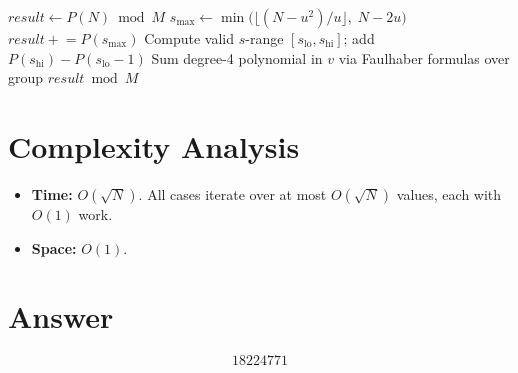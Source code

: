 \documentclass[11pt,a4paper]{article}
\begin{document}
\begin{algorithmic}[1]
  \State $\mathit{result} \gets P(N) \bmod M$ 
   
    \State $s_{\max} \gets \min\!\bigl(\lfloor(N-u^2)/u\rfloor,\; N-2u\bigr)$
     $\mathit{result} \mathrel{+}= P(s_{\max})$ \EndIf
  \EndFor
   
    \State Compute valid $s$-range $[s_{\mathrm{lo}}, s_{\mathrm{hi}}]$; add $P(s_{\mathrm{hi}}) - P(s_{\mathrm{lo}}-1)$
  \EndFor
   
    \State Sum degree-4 polynomial in $v$ via Faulhaber formulas over group
  \EndFor
  \State \Return $\mathit{result} \bmod M$
\EndFunction
\end{algorithmic}

\section{Complexity Analysis}

\begin{itemize}
  \item \textbf{Time:} $O(\sqrt{N})$.  All cases iterate over at most $O(\sqrt{N})$ values, each with $O(1)$ work.
  \item \textbf{Space:} $O(1)$.
\end{itemize}

\section{Answer}

\[
\boxed{18224771}
\]
\end{document}
